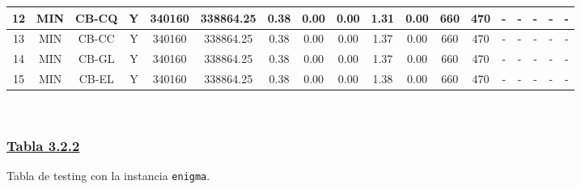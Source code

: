 {\begin{tabular}{ *{17}{c|} c }
\hline
12 & MIN & CB-CQ & Y & 340160 & 338864.25 & 0.38 & 0.00 & 0.00 & 1.31 & 0.00 & 660 & 470 & - & - & - & - & -\\
\hline
13 & MIN & CB-CC & Y & 340160 & 338864.25 & 0.38 & 0.00 & 0.00 & 1.37 & 0.00 & 660 & 470 & - & - & - & - & -\\
\hline
14 & MIN & CB-GL & Y & 340160 & 338864.25 & 0.38 & 0.00 & 0.00 & 1.37 & 0.00 & 660 & 470 & - & - & - & - & -\\
\hline
15 & MIN & CB-EL & Y & 340160 & 338864.25 & 0.38 & 0.00 & 0.00 & 1.38 & 0.00 & 660 & 470 & - & - & - & - & -\\
\hline
\end{tabular}\\
\vspace{4mm}
}

\subsubsection*{\underline{Tabla 3.2.2}}
\noindent Tabla de testing con la instancia \verb_enigma_.\\

